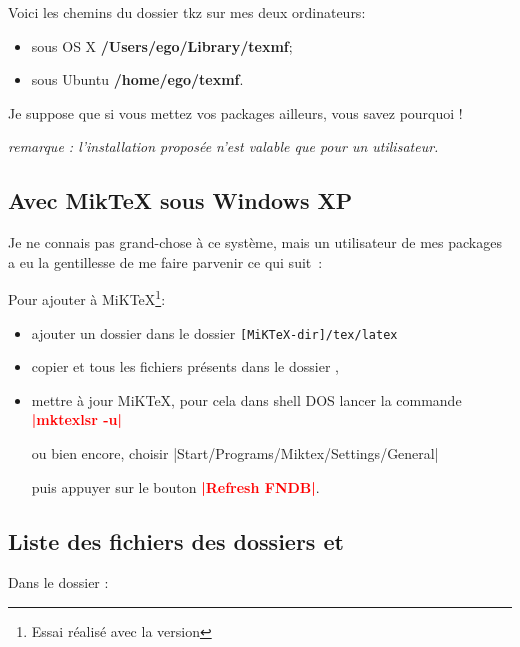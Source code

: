  Voici les chemins du dossier tkz sur mes deux ordinateurs:      

\medskip
\begin{itemize}\setlength{\itemsep}{5pt}
\item   sous OS X \colorbox{blue!30}{\textbf{/Users/ego/Library/texmf}}; 
\item   sous Ubuntu \colorbox{blue!30}{\textbf{/home/ego/texmf}}.
\end{itemize} 


Je suppose que si vous mettez vos packages ailleurs, vous savez pourquoi !

\emph{remarque : l'installation proposée n'est valable que pour un utilisateur.}  

\subsection{Avec MikTeX sous Windows XP}

Je ne connais pas grand-chose à ce système, mais un utilisateur de mes packages  a eu la gentillesse de me faire parvenir ce qui suit~:

Pour ajouter  à MiKTeX\footnote{Essai réalisé avec la version }:

\begin{itemize}\setlength{\itemsep}{10pt}
  \item ajouter un dossier  dans le dossier
       \textcolor{blue!60!black}{\texttt{[MiKTeX-dir]/tex/latex}}
  \item copier  et tous les fichiers présents  dans le dossier ,
  \item mettre à jour  MiKTeX, pour cela dans shell DOS lancer la commande   \textbf{\textcolor{red}{|mktexlsr -u|}} 
  
   ou bien encore, choisir \textcolor{red!50}{|Start/Programs/Miktex/Settings/General|}
   
    puis appuyer sur le bouton  \textbf{\textcolor{red}{|Refresh FNDB|}}.
\end{itemize} 

\subsection{Liste des fichiers des dossiers   et }

Dans le dossier   :

